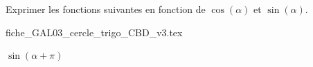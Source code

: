 Exprimer les fonctions suivantes en fonction de $\cos(\alpha)$ et $\sin(\alpha)$.
                                \initialisationPartieDroite %
\begin{center}
{fiche_GAL03_cercle_trigo_CBD_v3.tex}
\end{center}
                               \finalisationDuPartageDePage %


\medskip

\debutEntrainement


\begin{enonce}
$\sin(\alpha+\pi)$
\end{enonce}

\reponse{$-\sin(\alpha)$}

